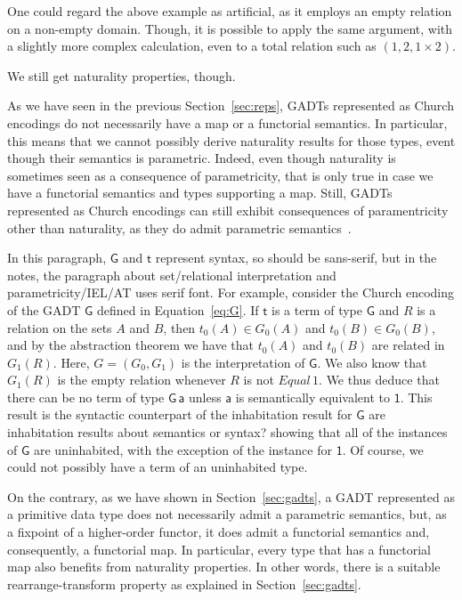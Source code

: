 \documentclass[acmsmall,screen,review,anonymous]{acmart}
\theoremstyle{definition}
\begin{document}
One could regard the above example as artificial, as it employs an
empty relation on a non-empty domain.  Though, it is possible to apply
the same argument, with a slightly more complex calculation, even to a
total relation such as $(1, 2, 1 \times 2)$.

We still get naturality properties, though.

\vspace*{0.2in}

As we have seen in the previous Section~\ref{sec:reps}, GADTs
represented as Church encodings do not necessarily have a map or a
functorial semantics.  In particular, this means that we cannot
possibly derive naturality results for those types, event though their
semantics is parametric.  Indeed, even though naturality is sometimes
seen as a consequence of parametricity, that is only true in case we
have a functorial semantics and types supporting a map.  Still, GADTs
represented as Church encodings can still exhibit consequences of
paramentricity other than naturality, as they do admit parametric
semantics~\cite{atk12}.

\begin{example}
{\color{blue} In this paragraph, $\mathsf{G}$ and $\mathsf{t}$
  represent syntax, so should be sans-serif, but in the notes, the
  paragraph about set/relational interpretation and
  parametricity/IEL/AT uses serif font.} For example, consider the
Church encoding of the GADT $\mathsf{G}$ defined in
Equation~\ref{eq:G}.  If $\mathsf{t}$ is a term of type
$\mathsf{G}$ and $R$ is a relation on the sets $A$ and $B$, then
$t_0(A) \in G_0(A)$ and $t_0(B) \in G_0(B)$, and by the abstraction
theorem we have that $t_0(A)$ and $t_0(B)$ are related in $G_1(R)$.
{\color{blue} Here, $G = (G_0,G_1)$ is the interpretation of
  $\mathsf{G}$.}  We also know that $G_1(R)$ is the empty relation
whenever $R$ is not $\mathit{Equal}\,1$.  We thus deduce that there
can be no term of type $\mathsf{G\,a}$ unless $\mathsf{a}$ is
semantically equivalent to $\mathsf{1}$.  This result is the syntactic
counterpart of the inhabitation result for $\mathsf{G}$ {\color{blue}
  are inhabitation results about semantics or syntax?}  showing that
all of the instances of $\mathsf{G}$ are uninhabited, with the
exception of the instance for $\mathsf{1}$.  Of course, we could not
possibly have a term of an uninhabited type.
\end{example}

On the contrary, as we have shown in Section~\ref{sec:gadts}, a
GADT represented as a primitive data type does not necessarily admit a
parametric semantics, but, as a fixpoint of a higher-order functor, it
does admit a functorial semantics and, consequently, a functorial map.
In particular, every type that has a functorial map also benefits from
naturality properties.  In other words, there is a suitable
rearrange-transform property as explained in Section~\ref{sec:gadts}.
\end{document}
